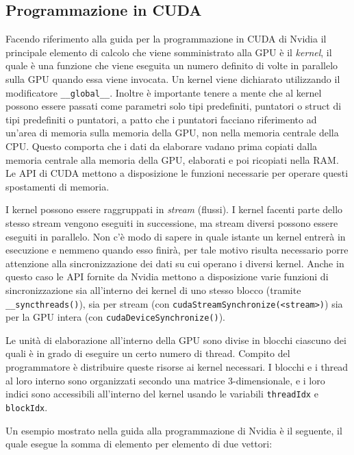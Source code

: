 \subsection{Programmazione in CUDA}
Facendo riferimento alla guida per la programmazione in CUDA di Nvidia\cite{cuda_programming_guide} il principale elemento di calcolo che viene somministrato alla GPU è il \textit{kernel}, il quale è una funzione che viene eseguita un numero definito di volte in parallelo sulla GPU quando essa viene invocata. Un kernel viene dichiarato utilizzando il modificatore \lstinline{__global__}. Inoltre è importante tenere a mente che al kernel possono essere passati come parametri solo tipi predefiniti, puntatori o struct di tipi predefiniti o puntatori, a patto che i puntatori facciano riferimento ad un'area di memoria sulla memoria della GPU, non nella memoria centrale della CPU. Questo comporta che i dati da elaborare vadano prima copiati dalla memoria centrale alla memoria della GPU, elaborati e poi ricopiati nella RAM. Le API di CUDA mettono a disposizione le funzioni necessarie per operare questi spostamenti di memoria.

I kernel possono essere raggruppati in \textit{stream} (flussi). I kernel facenti parte dello stesso stream vengono eseguiti in successione, ma stream diversi possono essere eseguiti in parallelo. Non c'è modo di sapere in quale istante un kernel entrerà in esecuzione e nemmeno quando esso finirà, per tale motivo risulta necessario porre attenzione alla sincronizzazione dei dati su cui operano i diversi kernel. Anche in questo caso le API fornite da Nvidia mettono a disposizione varie funzioni di sincronizzazione sia all'interno dei kernel di uno stesso blocco (tramite \lstinline!__syncthreads()!), sia per stream (con \lstinline!cudaStreamSynchronize(<stream>)!) sia per la GPU intera (con \lstinline!cudaDeviceSynchronize()!).

Le unità di elaborazione all'interno della GPU sono divise in blocchi ciascuno dei quali è in grado di eseguire un certo numero di thread. Compito del programmatore è distribuire queste risorse ai kernel necessari. I blocchi e i thread al loro interno sono organizzati secondo una matrice 3-dimensionale, e i loro indici sono accessibili all'interno del kernel usando le variabili \lstinline{threadIdx} e \lstinline{blockIdx}.

Un esempio mostrato nella guida alla programmazione di Nvidia \cite{cuda_programming_guide} è il seguente, il quale esegue la somma di elemento per elemento di due vettori:

